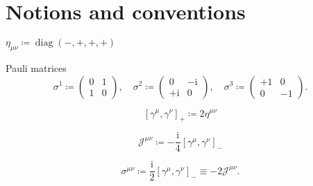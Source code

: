 \documentclass[12pt]{article}
\newcommand\mi{\mathrm{i}} %
\DeclareMathOperator{\diag}{diag}
\DeclareMathOperator{\Tr}{Tr}
\newcommand{\rbr}[1]{{\left(#1\right)}}
\newcommand{\sbr}[1]{{\left[#1\right]}}
\newcommand{\rfun}[2]{{#1}\mathopen{}\left(#2\right)\mathclose{}}
\newcommand{\sfun}[2]{{#1}\mathopen{}\left[#2\right]\mathclose{}}
\begin{document}



\cite{weisskopf1936}




\appendix

\section{Notions and conventions}

$\eta_{\mu\nu} \coloneqq \rfun{\diag}{-, +, +, +}$

Pauli matrices
\begin{equation}
\sigma^1 \coloneqq \begin{pmatrix} 0 & 1 \\ 1 & 0 \end{pmatrix},\quad
\sigma^2 \coloneqq \begin{pmatrix} 0 & -\mi \\ +\mi & 0 \end{pmatrix},\quad
\sigma^3 \coloneqq \begin{pmatrix} +1 & 0 \\ 0 & -1 \end{pmatrix}.
\end{equation}

\citep[sec.~5]{weinberg1995}
\begin{equation}
\sbr{\gamma^\mu, \gamma^\nu}_+ \coloneqq 2\eta^{\mu\nu}
\end{equation}

\begin{equation}
\mathscr{J}^{\mu\nu} \coloneqq -\frac{\mi}{4}\sbr{\gamma^\mu, \gamma^\nu}_-
\end{equation}

\begin{equation}
\sigma^{\mu\nu} \coloneqq \frac{\mi}{2}\sbr{\gamma^\mu, \gamma^\nu}_-
\equiv -2 \mathscr{J}^{\mu\nu}.
\end{equation}
\end{document}

